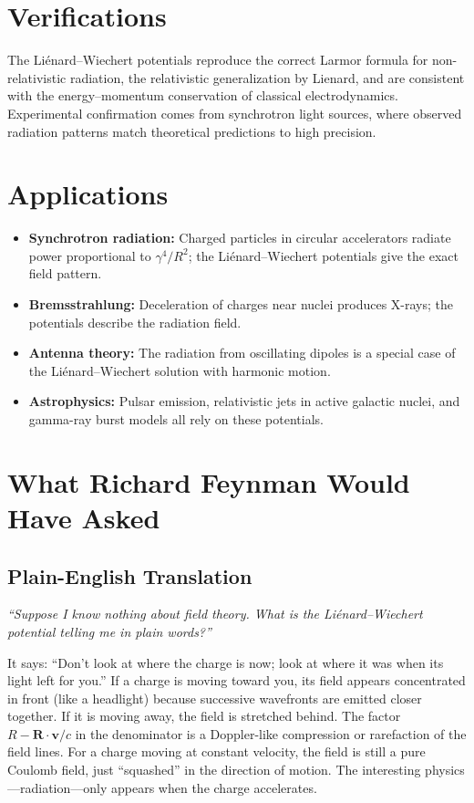 \section*{Verifications}

The Liénard--Wiechert potentials reproduce the correct Larmor formula for non-relativistic radiation, the relativistic generalization by Lienard, and are consistent with the energy--momentum conservation of classical electrodynamics. Experimental confirmation comes from synchrotron light sources, where observed radiation patterns match theoretical predictions to high precision.
\section*{Applications}

\begin{itemize}
  \item \textbf{Synchrotron radiation:} Charged particles in circular accelerators radiate power proportional to $\gamma^{4}/R^{2}$; the Liénard--Wiechert potentials give the exact field pattern.
  \item \textbf{Bremsstrahlung:} Deceleration of charges near nuclei produces X-rays; the potentials describe the radiation field.
  \item \textbf{Antenna theory:} The radiation from oscillating dipoles is a special case of the Liénard--Wiechert solution with harmonic motion.
  \item \textbf{Astrophysics:} Pulsar emission, relativistic jets in active galactic nuclei, and gamma-ray burst models all rely on these potentials.
\end{itemize}
\section*{What Richard Feynman Would Have Asked}

\subsection*{Plain-English Translation}
\textit{``Suppose I know nothing about field theory. What is the Liénard--Wiechert potential telling me in plain words?''}

It says: ``Don't look at where the charge is now; look at where it was when its light left for you.'' If a charge is moving toward you, its field appears concentrated in front (like a headlight) because successive wavefronts are emitted closer together. If it is moving away, the field is stretched behind. The factor $R - \mathbf{R}\cdot\mathbf{v}/c$ in the denominator is a Doppler-like compression or rarefaction of the field lines. For a charge moving at constant velocity, the field is still a pure Coulomb field, just ``squashed'' in the direction of motion. The interesting physics---radiation---only appears when the charge accelerates.

